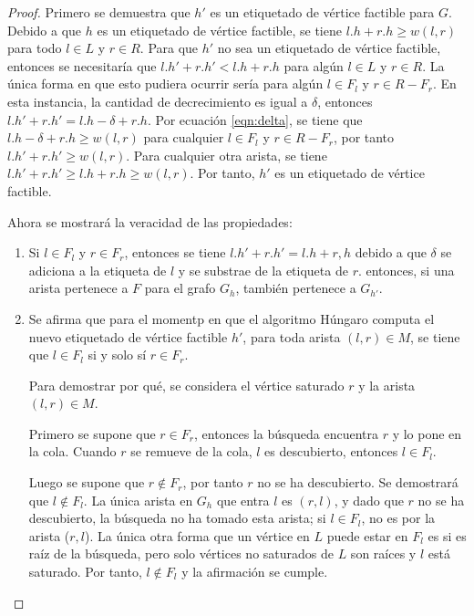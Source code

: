 \documentclass[10pt]{article} %
\begin{document}
\begin{proof}
	Primero se demuestra que $h'$ es un etiquetado de v\'ertice factible para $G$. Debido a que $h$ es un etiquetado de v\'ertice factible, se tiene $l.h + r.h \geq w(l,r)$ para todo $l \in L$ y $r \in R$. Para que $h'$ no sea un etiquetado de v\'ertice factible, entonces se necesitar\'ia que $l.h' + r.h' < l.h + r.h$ para alg\'un $l \in L$ y $r \in R$. La \'unica forma en que esto pudiera ocurrir ser\'ia para alg\'un $l \in F_l$ y $r \in R-F_r$. En esta instancia, la cantidad de decrecimiento es igual a $\delta$, entonces $l.h' + r.h' = l.h - \delta + r.h$. Por ecuaci\'on \ref{eqn:delta}, se tiene que $l.h - \delta + r.h \geq w(l,r)$ para cualquier $l \in F_l$ y $r \in R - F_r$, por tanto $l.h' + r.h' \geq w(l,r)$. Para cualquier otra arista, se tiene $l.h' + r.h' \geq l.h + r.h \geq w(l,r)$. Por tanto, $h'$ es un etiquetado de v\'ertice factible.
	
	Ahora se mostrar\'a la veracidad de las propiedades:
	
	\begin{enumerate}
		\item Si $l \in F_l$ y $r \in F_r$, entonces se tiene $l.h' + r.h' = l.h + r,h$ debido a que $\delta$ se adiciona a la etiqueta de $l$ y se substrae de la etiqueta de $r$. entonces, si una arista pertenece a $F$ para el grafo $G_h$, tambi\'en pertenece a $G_{h'}$.
		\item Se afirma que para el momentp en que el algoritmo H\'ungaro computa el nuevo etiquetado de v\'ertice factible $h'$, para toda arista $(l,r) \in M$, se tiene que $l \in F_l$ si y solo s\'i $r \in F_r$. 
		
		Para demostrar por qu\'e, se considera el v\'ertice saturado $r$ y la arista $(l,r) \in M$. 
		
		Primero se supone que $r \in F_r$, entonces la b\'usqueda encuentra $r$ y lo pone en la cola. Cuando $r$ se remueve de la cola, $l$ es descubierto, entonces $l \in F_l$. 
		
		Luego se supone que $r \notin F_r$, por tanto $r$ no se ha descubierto. Se demostrar\'a que $l \notin F_l$. La \'unica arista en $G_h$ que entra $l$ es $(r,l)$, y dado que $r$ no se ha descubierto, la b\'usqueda no ha tomado esta arista; si $l \in F_l$, no es por la arista ($r,l$). La \'unica otra forma que un v\'ertice en $L$ puede estar en $F_l$ es si es ra\'iz de la b\'usqueda, pero solo v\'ertices no saturados de $L$ son ra\'ices y $l$ est\'a saturado. Por tanto, $l \notin F_l$ y la afirmaci\'on se cumple.
		

\end{enumerate}
\end{proof}
\end{document}
